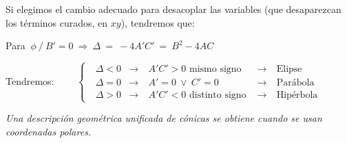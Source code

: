 Si elegimos el cambio adecuado para desacoplar las variables (que desaparezcan los términos curados, en $xy$), tendremos que:

Para $\ \phi \ \big/ \ B'=0 \ \Rightarrow \ \Delta  \ = \ -4A'C' \ = \ B^2-4AC$

Tendremos: $\qquad \left\{ \ \  \begin{array}{lclcl} \ \Delta < 0 &\to& \ A'C'>0 \text{ mismo signo } &\to& \ \text{Elipse} \\ \ \Delta=0 &\to& \ A'=0 \ \vee \ C'=0  &\to& \ \text{Parábola} \\ \ \Delta>0 &\to& \ A'C'<0 \text{ distinto signo }  &\to& \ \text{Hipérbola} \end{array} \right.$ \QED
 	

\vspace{20mm}

\textcolor{NavyBlue}{\emph{Una descripción geométrica unificada de cónicas se obtiene cuando se usan coordenadas polares}.}




